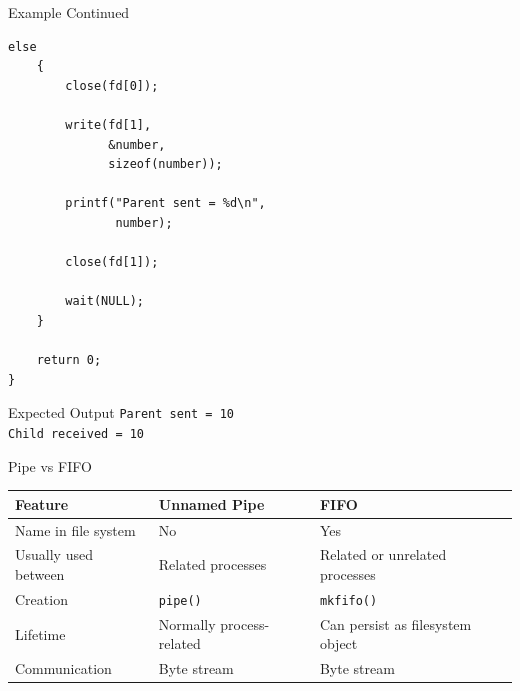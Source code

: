 \documentclass[aspectratio=169]{beamer}
\begin{document}
\begin{frame}[fragile]{Example Continued}

\begin{lstlisting}[style=cstyle]
    else
    {
        close(fd[0]);

        write(fd[1],
              &number,
              sizeof(number));

        printf("Parent sent = %d\n",
               number);

        close(fd[1]);

        wait(NULL);
    }

    return 0;
}
\end{lstlisting}

\begin{block}{Expected Output}
\texttt{Parent sent = 10}\\
\texttt{Child received = 10}
\end{block}

\end{frame}

\begin{frame}{Pipe vs FIFO}

\begin{center}
\begin{tabular}{|p{4cm}|p{4cm}|p{4cm}|}
\hline
\textbf{Feature} &
\textbf{Unnamed Pipe} &
\textbf{FIFO}
\\
\hline

Name in file system &
No &
Yes
\\
\hline

Usually used between &
Related processes &
Related or unrelated processes
\\
\hline

Creation &
\texttt{pipe()} &
\texttt{mkfifo()}
\\
\hline

Lifetime &
Normally process-related &
Can persist as filesystem object
\\
\hline

Communication &
Byte stream &
Byte stream
\\
\hline

\end{tabular}
\end{center}

\end{frame}
\end{document}
